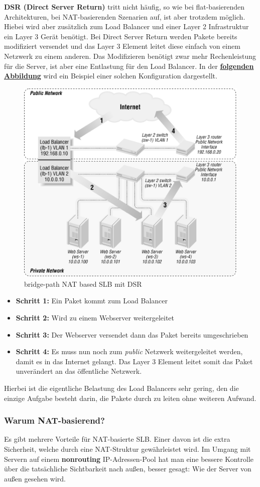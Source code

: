 \textbf{DSR (Direct Server Return)} tritt nicht häufig, so wie bei flat-basierenden Architekturen, bei NAT-basierenden Szenarien auf, ist aber trotzdem möglich. Hiebei wird aber zusätzlich zum Load Balancer und einer Layer 2 Infrastruktur ein Layer 3 Gerät benötigt. Bei Direct Server Return werden Pakete bereits modifiziert versendet und das Layer 3 Element leitet diese einfach von einem Netzwerk zu einem anderen. Das Modifizieren benötigt zwar mehr Rechenleistung für die Server, ist aber eine Entlastung für den Load Balancer. In der \textbf{\hyperref[nat_slb_03]{folgenden Abbildung}} wird ein Beispiel einer solchen Konfiguration dargestellt.
\begin{figure}[!h]
	\begin{center}
		\includegraphics[width=0.5\linewidth]{images/slb_0703}
		\caption{bridge-path NAT based SLB mit DSR}
		\label{nat_slb_03}
	\end{center}
\end{figure}

\begin{itemize}
	\item \textbf{Schritt 1:}
	\subitem Ein Paket kommt zum Load Balancer
	\item \textbf{Schritt 2:}
	\subitem Wird zu einem Webserver weitergeleitet
	\item \textbf{Schritt 3:}
	\subitem Der Webserver versendet dann das Paket bereits umgeschrieben
	\item \textbf{Schritt 4:}
	\subitem Es muss nun noch zum \textit{public} Netzwerk weitergeleitet werden, damit es in das Internet gelangt. Das Layer 3 Element leitet somit das Paket unverändert an das öffentliche Netzwerk.
\end{itemize}
Hierbei ist die eigentliche Belastung des Load Balancers sehr gering, den die einzige Aufgabe besteht darin, die Pakete durch zu leiten ohne weiteren Aufwand.

\subsubsection{Warum NAT-basierend?}
Es gibt mehrere Vorteile für NAT-basierte SLB. Einer davon ist die extra Sicherheit, welche durch eine NAT-Struktur gewährleistet wird. Im Umgang mit Servern auf einem \textbf{nonrouting} IP-Adressen-Pool hat man eine bessere Kontrolle über die tatsächliche Sichtbarkeit nach außen, besser gesagt: Wie der Server von außen gesehen wird.

